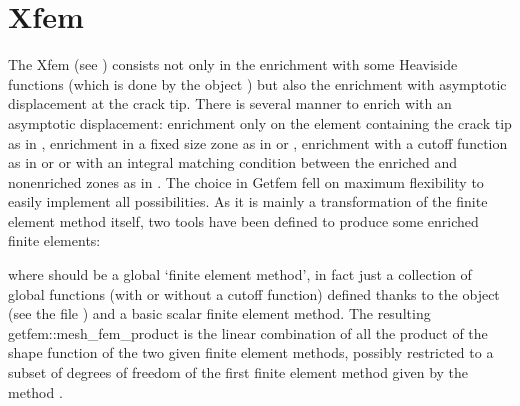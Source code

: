 \documentclass[a4paper,11pt,english]{sphinxmanual}
\begin{document}
\section{Xfem}
\label{\detokenize{userdoc/xfem:xfem}}
The Xfem (see ) consists not only in the enrichment with some Heaviside functions (which is done by the object ) but also the enrichment with asymptotic displacement at the crack tip. There is several manner to enrich with an asymptotic displacement: enrichment only on the element containing the crack tip as in , enrichment in a fixed size zone as in  or , enrichment with a cut\sphinxhyphen{}off function as in  or  or with an integral matching condition between the enriched and non\sphinxhyphen{}enriched zones as in . The choice in Getfem fell on maximum flexibility to easily implement all possibilities. As it is mainly a transformation of the finite element method itself, two tools have been defined to produce some enriched finite elements:

\begin{sphinxVerbatim}[commandchars=\\\{\}]
  
  
\end{sphinxVerbatim}

where  should be a global ‘finite element method’, in fact just a collection of global functions (with or without a cut\sphinxhyphen{}off function) defined thanks to the object  (see the file ) and  a basic scalar finite element method. The resulting \textasciigrave{}\textasciigrave{} getfem::mesh\_fem\_product\textasciigrave{}\textasciigrave{} is the linear combination of all the product of the shape function of the two given finite element methods, possibly restricted to a sub\sphinxhyphen{}set of degrees of freedom of the first finite element method given by the method .
\end{document}
